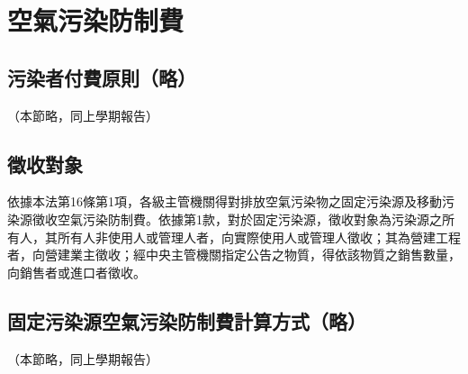 \section{空氣污染防制費}

\subsection{污染者付費原則（略）}
（本節略，同上學期報告）



\subsection{徵收對象}

依據本法第16條第1項，各級主管機關得對排放空氣污染物之固定污染源及移動污染源徵收空氣污染防制費。依據第1款，對於固定污染源，徵收對象為污染源之所有人，其所有人非使用人或管理人者，向實際使用人或管理人徵收；其為營建工程者，向營建業主徵收；經中央主管機關指定公告之物質，得依該物質之銷售數量，向銷售者或進口者徵收。

\subsection{固定污染源空氣污染防制費計算方式（略）}
（本節略，同上學期報告）


